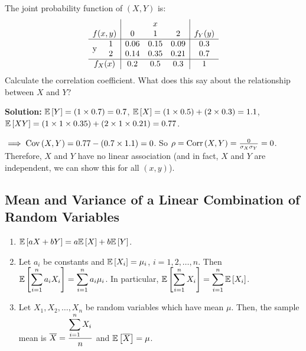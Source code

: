 \begin{example}
    The joint probability function of $(X,Y)$ is:
    \[
        \begin{array}{cc|ccc|c}
            & & \multicolumn{3}{c|}{x} & \\
            \multicolumn{2}{c|}{f(x,y)} & 0 & 1 & 2 & f_Y(y) \\
            \hline
            \multirow{2}{*}{y} 
              & 1 & 0.06 & 0.15 & 0.09 & 0.3 \\
              & 2 & 0.14 & 0.35 & 0.21 & 0.7 \\
            \hline
            \multicolumn{2}{c|}{f_X(x)} & 0.2 & 0.5 & 0.3 & 1
        \end{array}
    \]
    Calculate the correlation coefficient. What does this say about the relationship between $X$ and $Y$?

    \textbf{Solution:} $\mathbb{E}\left[{Y}\right] = (1 \times 0.7) = 0.7$, $\mathbb{E}\left[{X}\right] = (1 \times 0.5) + (2 \times 0.3) = 1.1$, $\mathbb{E}\left[{XY}\right] = (1 \times 1 \times 0.35) + (2 \times 1 \times 0.21) = 0.77$. 

    $\implies \operatorname{Cov}\left({X,Y}\right) = 0.77 - (0.7 \times 1.1) = 0$. So $\rho = \operatorname{Corr}\left({X,Y}\right) = \frac{0}{\sigma_X \sigma_Y} = 0$. \\
    Therefore, $X$ and $Y$ have no linear association (and in fact, $X$ and $Y$ are independent, we can show this for all $(x,y)$).
\end{example}

\subsection{Mean and Variance of a Linear Combination of Random Variables}

\begin{theorem}
    \phantom{}
    \begin{enumerate}
        \item $\mathbb{E}\left[{aX+bY}\right] = a\mathbb{E}\left[{X}\right] + b\mathbb{E}\left[{Y}\right]$.
        \item Let $a_i$ be constants and $\mathbb{E}\left[{X_i}\right] = \mu_i$, $i = 1,2,\ldots ,n$. Then $\mathbb{E}\left[{\displaystyle \sum_{i=1}^{n} a_iX_i}\right] = \displaystyle \sum_{i=1}^{n} a_i \mu_i$. In particular, $\mathbb{E}\left[{\displaystyle \sum_{i=1}^{n} X_i}\right]  = \displaystyle \sum_{i=1}^{n} \mathbb{E}\left[{X_i}\right]$. \vspace{1mm}
        \item Let $X_1, X_2,\ldots , X_n$ be random variables which have mean $\mu$. Then, the sample mean is $\overline{X} = \displaystyle \frac{\displaystyle \sum_{i=1}^{n} X_i}{n}$ and $\mathbb{E}\left[{\overline{X}}\right] = \mu$. 
    \end{enumerate}
\end{theorem}


